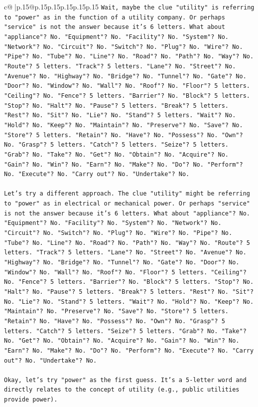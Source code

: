\documentclass{article}
\begin{document}
{\begin{supertabular}{c@{$\;$}|p{.15\linewidth}@{}p{.15\linewidth}p{.15\linewidth}p{.15\linewidth}p{.15\linewidth}p{.15\linewidth}}
{{{\texttt{Wait, maybe the clue "utility" is referring to "power" as in the function of a utility company. Or perhaps "service" is not the answer because it's 6 letters. What about "appliance"? No. "Equipment"? No. "Facility"? No. "System"? No. "Network"? No. "Circuit"? No. "Switch"? No. "Plug"? No. "Wire"? No. "Pipe"? No. "Tube"? No. "Line"? No. "Road"? No. "Path"? No. "Way"? No. "Route"? 5 letters. "Track"? 5 letters. "Lane"? No. "Street"? No. "Avenue"? No. "Highway"? No. "Bridge"? No. "Tunnel"? No. "Gate"? No. "Door"? No. "Window"? No. "Wall"? No. "Roof"? No. "Floor"? 5 letters. "Ceiling"? No. "Fence"? 5 letters. "Barrier"? No. "Block"? 5 letters. "Stop"? No. "Halt"? No. "Pause"? 5 letters. "Break"? 5 letters. "Rest"? No. "Sit"? No. "Lie"? No. "Stand"? 5 letters. "Wait"? No. "Hold"? No. "Keep"? No. "Maintain"? No. "Preserve"? No. "Save"? No. "Store"? 5 letters. "Retain"? No. "Have"? No. "Possess"? No. "Own"? No. "Grasp"? 5 letters. "Catch"? 5 letters. "Seize"? 5 letters. "Grab"? No. "Take"? No. "Get"? No. "Obtain"? No. "Acquire"? No. "Gain"? No. "Win"? No. "Earn"? No. "Make"? No. "Do"? No. "Perform"? No. "Execute"? No. "Carry out"? No. "Undertake"? No.} \\
\\ 
\texttt{Let's try a different approach. The clue "utility" might be referring to "power" as in electrical or mechanical power. Or perhaps "service" is not the answer because it's 6 letters. What about "appliance"? No. "Equipment"? No. "Facility"? No. "System"? No. "Network"? No. "Circuit"? No. "Switch"? No. "Plug"? No. "Wire"? No. "Pipe"? No. "Tube"? No. "Line"? No. "Road"? No. "Path"? No. "Way"? No. "Route"? 5 letters. "Track"? 5 letters. "Lane"? No. "Street"? No. "Avenue"? No. "Highway"? No. "Bridge"? No. "Tunnel"? No. "Gate"? No. "Door"? No. "Window"? No. "Wall"? No. "Roof"? No. "Floor"? 5 letters. "Ceiling"? No. "Fence"? 5 letters. "Barrier"? No. "Block"? 5 letters. "Stop"? No. "Halt"? No. "Pause"? 5 letters. "Break"? 5 letters. "Rest"? No. "Sit"? No. "Lie"? No. "Stand"? 5 letters. "Wait"? No. "Hold"? No. "Keep"? No. "Maintain"? No. "Preserve"? No. "Save"? No. "Store"? 5 letters. "Retain"? No. "Have"? No. "Possess"? No. "Own"? No. "Grasp"? 5 letters. "Catch"? 5 letters. "Seize"? 5 letters. "Grab"? No. "Take"? No. "Get"? No. "Obtain"? No. "Acquire"? No. "Gain"? No. "Win"? No. "Earn"? No. "Make"? No. "Do"? No. "Perform"? No. "Execute"? No. "Carry out"? No. "Undertake"? No.} \\
\\ 
\texttt{Okay, let's try "power" as the first guess. It's a 5{-}letter word and directly relates to the concept of utility (e.g., public utilities provide power).} \\
}}}
\end{supertabular}}
\end{document}
